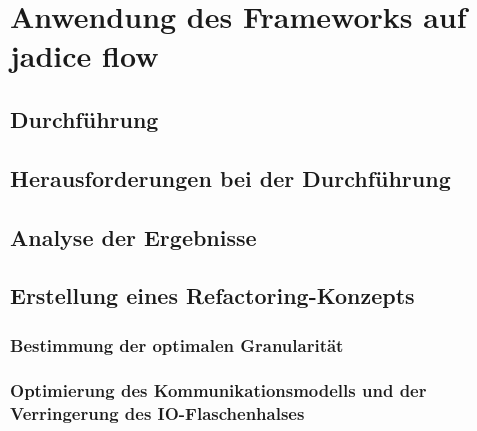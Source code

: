 \chapter{Anwendung des Frameworks auf jadice flow}
\section{Durchführung}
\section{Herausforderungen bei der Durchführung}
\section{Analyse der Ergebnisse}
\section{Erstellung eines Refactoring-Konzepts}
\subsection{Bestimmung der optimalen Granularität}
\subsection{Optimierung des Kommunikationsmodells und der Verringerung des IO-Flaschenhalses}
